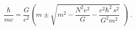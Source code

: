 \begin{equation} \label{eqp4a}
\frac{\hbar}{mc} = \frac{G}{c^2} \left( m \pm \sqrt{m^2
-\frac{N^2 e^2}{G} - \frac{c^2 \hbar^2 \, s^2}{G^2m^2}} \,\, \right) \;.
\end{equation}

